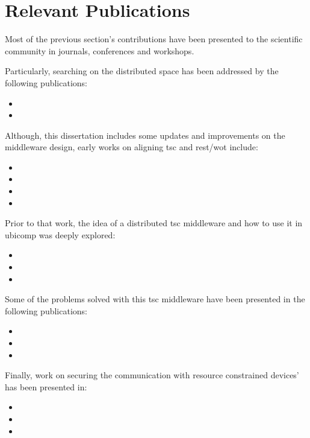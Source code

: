 \section{Relevant Publications}


Most of the previous section's contributions have been presented to the scientific community in journals, conferences and workshops.


Particularly, searching on the distributed space has been addressed by the following publications:
\begin{itemize}
 \item[] 
 \item[] 
\end{itemize}


Although, this dissertation includes some updates and improvements on the middleware design, early works on aligning \ac{tsc} and \ac{rest}/\ac{wot} include:
\begin{itemize}
 \item[] 
 \item[] 
 \item[] 
 \item[] 
\end{itemize}


Prior to that work, the idea of a distributed \ac{tsc} middleware and how to use it in \ac{ubicomp} was deeply explored: %
\begin{itemize}
 \item[] 
 \item[] 
 \item[] 
\end{itemize}


Some of the problems solved with this \ac{tsc} middleware have been presented in the following publications:
\begin{itemize}
 \item[] 
 \item[] 
 \item[] 
\end{itemize}


Finally, work on securing the communication with resource constrained devices' has been presented in:
\begin{itemize}
 \item[]  %
 \item[]  %
 \item[]  %
\end{itemize}